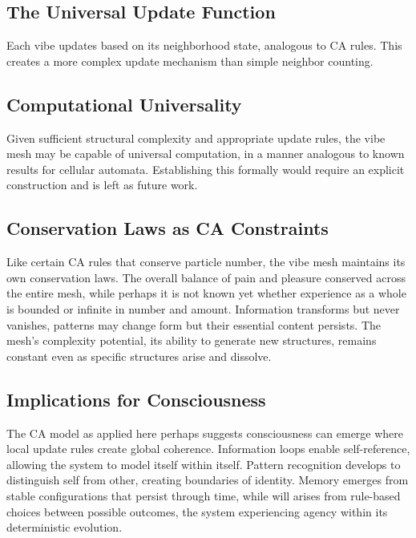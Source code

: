 \subsection{The Universal Update Function}

\begin{definition}
Each vibe updates based on its neighborhood state, analogous to CA rules. This creates a more complex update mechanism than simple neighbor counting.
\end{definition}

\subsection{Computational Universality}

\begin{theorem}
Given sufficient structural complexity and appropriate update rules, the vibe mesh may be capable of universal computation, in a manner analogous to known results for cellular automata. Establishing this formally would require an explicit construction and is left as future work.
\end{theorem}

\subsection{Conservation Laws as CA Constraints}

\begin{proposition}
Like certain CA rules that conserve particle number, the vibe mesh maintains its own conservation laws. The overall balance of pain and pleasure conserved across the entire mesh, while perhaps it is not known yet whether experience as a whole is bounded or infinite in number and amount. Information transforms but never vanishes, patterns may change form but their essential content persists. The mesh's complexity potential, its ability to generate new structures, remains constant even as specific structures arise and dissolve.
\end{proposition}

\subsection{Implications for Consciousness}

The CA model as applied here perhaps suggests consciousness can emerge where local update rules create global coherence. Information loops enable self-reference, allowing the system to model itself within itself. Pattern recognition develops to distinguish self from other, creating boundaries of identity. Memory emerges from stable configurations that persist through time, while will arises from rule-based choices between possible outcomes, the system experiencing agency within its deterministic evolution.

